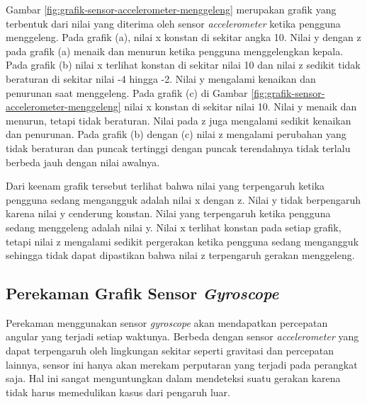 Gambar \ref{fig:grafik-sensor-accelerometer-menggeleng} merupakan grafik yang terbentuk dari nilai yang diterima oleh sensor \textit{accelerometer} ketika pengguna menggeleng. Pada grafik (a), nilai x konstan di sekitar angka 10. Nilai y dengan z pada grafik (a) menaik dan menurun ketika pengguna menggelengkan kepala. Pada grafik (b) nilai x terlihat konstan di sekitar nilai 10 dan nilai z sedikit tidak beraturan di sekitar nilai -4 hingga -2. Nilai y mengalami kenaikan dan penurunan saat menggeleng. Pada grafik (c) di Gambar \ref{fig:grafik-sensor-accelerometer-menggeleng} nilai x konstan di sekitar nilai 10. Nilai y menaik dan menurun, tetapi tidak beraturan. Nilai pada z juga mengalami sedikit kenaikan dan penurunan. Pada grafik (b) dengan (c) nilai z mengalami perubahan yang tidak beraturan dan puncak tertinggi dengan puncak terendahnya tidak terlalu berbeda jauh dengan nilai awalnya.

Dari keenam grafik tersebut terlihat bahwa nilai yang terpengaruh ketika pengguna sedang mengangguk adalah nilai x dengan z. Nilai y tidak berpengaruh karena nilai y cenderung konstan. Nilai yang terpengaruh ketika pengguna sedang menggeleng adalah nilai y. Nilai x terlihat konstan pada setiap grafik, tetapi nilai z mengalami sedikit pergerakan ketika pengguna sedang mengangguk sehingga tidak dapat dipastikan bahwa nilai z terpengaruh gerakan menggeleng. 

\subsection{Perekaman Grafik Sensor \textit{Gyroscope}}
\label{sec:analisis_grafik_sensor_gyroscope}
Perekaman menggunakan sensor \textit{gyroscope} akan mendapatkan percepatan angular yang terjadi setiap waktunya. Berbeda dengan sensor \textit{accelerometer} yang dapat terpengaruh oleh lingkungan sekitar seperti gravitasi dan percepatan lainnya, sensor ini hanya akan merekam perputaran yang terjadi pada perangkat saja. Hal ini sangat menguntungkan dalam mendeteksi suatu gerakan karena tidak harus memedulikan kasus dari pengaruh luar. 


